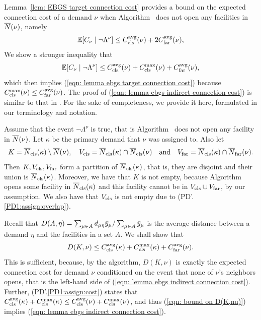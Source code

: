 \documentclass[oneside,final]{ucr}
\begin{document}
Lemma~\ref{lem: EBGS target connection cost} provides a bound on the
expected connection cost of a demand $\nu$ when Algorithm~{\EBGS} does not open
any facilities in ${\overline{N}}(\nu)$, namely
%
\begin{equation}
  \mathbb{E}[C_{\nu} \mid \neg \Lambda^{\nu}] \leq
  C_{{\mbox{\scriptsize\rm cls}}}^{{\mbox{\scriptsize\rm avg}}}(\nu) +  2C_{{\mbox{\scriptsize\rm far}}}^{{\mbox{\scriptsize\rm avg}}}(\nu),
			\label{eqn: lemma ebgs target connection cost}
\end{equation}
%
We show a stronger inequality that 
\begin{equation}
  \mathbb{E}[C_{\nu} \mid \neg \Lambda^{\nu}] \leq
  C_{{\mbox{\scriptsize\rm cls}}}^{{\mbox{\scriptsize\rm avg}}}(\nu) + C_{{\mbox{\scriptsize\rm cls}}}^{\max}(\nu) + C_{{\mbox{\scriptsize\rm far}}}^{{\mbox{\scriptsize\rm avg}}}(\nu)
			\label{eqn: lemma ebgs indirect connection cost},
\end{equation}
which then implies (\ref{eqn: lemma ebgs target connection cost})
because $C_{{\mbox{\scriptsize\rm cls}}}^{\max}(\nu) \leq C_{{\mbox{\scriptsize\rm far}}}^{{\mbox{\scriptsize\rm avg}}}(\nu)$.  The proof of (\ref{eqn:
  lemma ebgs indirect connection cost}) is similar to that in
\cite{ByrkaA10}. For the sake of completeness, we provide it here,
formulated in our terminology and notation.

Assume that the event $\neg \Lambda^{\nu}$ is true, that is Algorithm~{\EBGS}
does not open any facility in ${\overline{N}}(\nu)$.
Let $\kappa$ be the primary demand that $\nu$ was assigned to. Also let
\begin{equation*}
K = {\overline{N}}_{{\mbox{\scriptsize\rm cls}}}(\kappa) \setminus {\overline{N}}(\nu), \quad
V_{{\mbox{\scriptsize\rm cls}}} = {\overline{N}}_{{\mbox{\scriptsize\rm cls}}}(\kappa) \cap {\overline{N}}_{{\mbox{\scriptsize\rm cls}}}(\nu) \quad \textrm{and}\quad 
V_{{\mbox{\scriptsize\rm far}}} = {\overline{N}}_{{\mbox{\scriptsize\rm cls}}}(\kappa) \cap {\overline{N}}_{{\mbox{\scriptsize\rm far}}}(\nu).
\end{equation*}
% 
Then $K, V_{{\mbox{\scriptsize\rm cls}}}, V_{{\mbox{\scriptsize\rm far}}}$ form a partition of
${\overline{N}}_{{\mbox{\scriptsize\rm cls}}}(\kappa)$, that is, they are disjoint and their union is ${\overline{N}}_{{\mbox{\scriptsize\rm cls}}}(\kappa)$.
Moreover, we have that $K$ is not empty, because Algorithm~{\EBGS}
opens some facility in ${\overline{N}}_{{\mbox{\scriptsize\rm cls}}}(\kappa)$ and this facility cannot be in $V_{{\mbox{\scriptsize\rm cls}}}\cup V_{{\mbox{\scriptsize\rm far}}}$,
by our assumption. 
We also have that $V_{{\mbox{\scriptsize\rm cls}}}$ is not empty due to (PD'.\ref{PD1:assign:overlap}). 

Recall that $D(A,\eta) = \sum_{\mu\in A}d_{\mu\eta}{\bar y}_{\mu}/\sum_{\mu\in A}{\bar y}_{\mu}$
is the average distance between a demand $\eta$ and the facilities in a set $A$. We shall show that
%
\begin{equation}
	 D(K, \nu) \leq C_{{\mbox{\scriptsize\rm cls}}}^{{\mbox{\scriptsize\rm avg}}}(\kappa)+C_{{\mbox{\scriptsize\rm cls}}}^{\max}(\kappa) + C_{{\mbox{\scriptsize\rm far}}}^{{\mbox{\scriptsize\rm avg}}}(\nu).
				\label{eqn: bound on D(K,nu)}
\end{equation}
%
This is sufficient, because, by the algorithm, $D(K,\nu)$ is exactly 
the expected connection cost for demand $\nu$ conditioned on
the event that none of $\nu$'s neighbors 
opens, that is the left-hand side of (\ref{eqn: lemma ebgs indirect connection cost}).
Further, (PD'.\ref{PD1:assign:cost}) states that 
$C_{{\mbox{\scriptsize\rm cls}}}^{{\mbox{\scriptsize\rm avg}}}(\kappa)+C_{{\mbox{\scriptsize\rm cls}}}^{\max}(\kappa) \le C_{{\mbox{\scriptsize\rm cls}}}^{{\mbox{\scriptsize\rm avg}}}(\nu) + C_{{\mbox{\scriptsize\rm cls}}}^{\max}(\nu)$, and thus
(\ref{eqn: bound on D(K,nu)})  implies (\ref{eqn: lemma ebgs indirect connection cost}).
\end{document}
